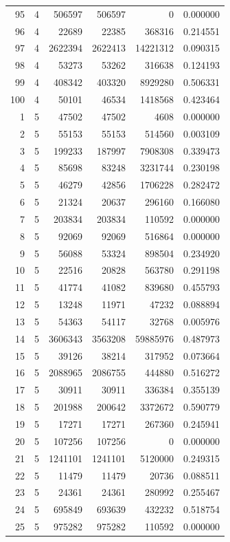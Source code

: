 \begin{longtable}{rrrrrr}
95 & 4 & 506597 & 506597 & 0 & 0.000000\\
96 & 4 & 22689 & 22385 & 368316 & 0.214551\\
97 & 4 & 2622394 & 2622413 & 14221312 & 0.090315\\
98 & 4 & 53273 & 53262 & 316638 & 0.124193\\
99 & 4 & 408342 & 403320 & 8929280 & 0.506331\\
100 & 4 & 50101 & 46534 & 1418568 & 0.423464\\
1 & 5 & 47502 & 47502 & 4608 & 0.000000\\
2 & 5 & 55153 & 55153 & 514560 & 0.003109\\
3 & 5 & 199233 & 187997 & 7908308 & 0.339473\\
4 & 5 & 85698 & 83248 & 3231744 & 0.230198\\
5 & 5 & 46279 & 42856 & 1706228 & 0.282472\\
6 & 5 & 21324 & 20637 & 296160 & 0.166080\\
7 & 5 & 203834 & 203834 & 110592 & 0.000000\\
8 & 5 & 92069 & 92069 & 516864 & 0.000000\\
9 & 5 & 56088 & 53324 & 898504 & 0.234920\\
10 & 5 & 22516 & 20828 & 563780 & 0.291198\\
11 & 5 & 41774 & 41082 & 839680 & 0.455793\\
12 & 5 & 13248 & 11971 & 47232 & 0.088894\\
13 & 5 & 54363 & 54117 & 32768 & 0.005976\\
14 & 5 & 3606343 & 3563208 & 59885976 & 0.487973\\
15 & 5 & 39126 & 38214 & 317952 & 0.073664\\
16 & 5 & 2088965 & 2086755 & 444880 & 0.516272\\
17 & 5 & 30911 & 30911 & 336384 & 0.355139\\
18 & 5 & 201988 & 200642 & 3372672 & 0.590779\\
19 & 5 & 17271 & 17271 & 267360 & 0.245941\\
20 & 5 & 107256 & 107256 & 0 & 0.000000\\
21 & 5 & 1241101 & 1241101 & 5120000 & 0.249315\\
22 & 5 & 11479 & 11479 & 20736 & 0.088511\\
23 & 5 & 24361 & 24361 & 280992 & 0.255467\\
24 & 5 & 695849 & 693639 & 432232 & 0.518754\\
25 & 5 & 975282 & 975282 & 110592 & 0.000000\\

\end{longtable}
